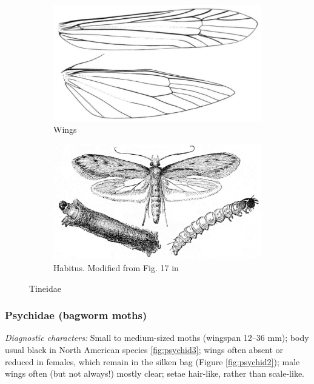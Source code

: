 \documentclass[letterpaper, 11pt]{article}
\begin{document}
\begin{figure}[ht!]
    \centering
    \begin{subfigure}[ht!]{0.45\textwidth}
        \includegraphics[width=\textwidth]{TineidWings}
        \caption{Wings \citep[][Fig. 6]{DavisTineid1998}}
        \label{fig:tineid1}
    \end{subfigure}
    \hfill %
    \begin{subfigure}[ht!]{0.50\textwidth}
        \includegraphics[width=\textwidth]{tineidHab.png}
        \caption{Habitus. Modified from Fig. 17 in \cite{bhlitem20176riley}}
        \label{fig:tineid2}
    \end{subfigure}
    \caption{Tineidae}\label{fig:tineids}
\end{figure}

\subsubsection{Psychidae (bagworm moths)}
\noindent{}\textit{Diagnostic characters:} Small to medium-sized moths (wingspan 12--36 mm); body usual black in North American species \ref{fig:psychid3}; wings often absent or reduced in females, which remain in the silken bag (Figure \ref{fig:psychid2}); male wings often (but not always!) mostly clear; setae hair-like, rather than scale-like.\\
\end{document}
